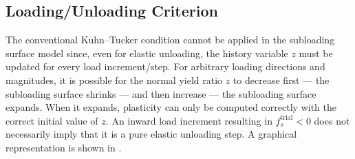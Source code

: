 \subsection{Loading/Unloading Criterion}\label{sec:correct_loading_criterion}
The conventional Kuhn--Tucker condition cannot be applied in the subloading surface model since, even for elastic unloading, the history variable $z$ must be updated for every load increment/step.
For arbitrary loading directions and magnitudes, it is possible for the normal yield ratio $z$ to decrease first --- the subloading surface shrinks --- and then increase --- the subloading surface expands.
When it expands, plasticity can only be computed correctly with the correct initial value of $z$.
An inward load increment resulting in $f_s^\text{trial}<0$ does not necessarily imply that it is a pure elastic unloading step.
A graphical representation is shown in .

